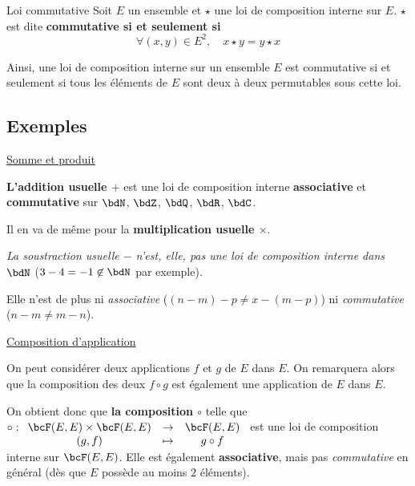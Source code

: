 \documentclass[a4paper,french,bookmarks]{article}
\begin{document}
\begin{definition}{Loi commutative}{}
    Soit $E$ un ensemble et $\star$ une loi de composition interne sur $E$. $\star$ est dite \bf{commutative} si et seulement si
    \[\forall (x, y) \in E^2,\quad x \star y = y \star x \]
\end{definition}

Ainsi, une loi de composition interne sur un ensemble $E$ est commutative si et seulement si tous les éléments de $E$ sont deux à deux permutables sous cette loi.

\subsection{Exemples}

\begin{enumerate}

    \ithand \underline{Somme et produit}
    
    \begin{enumerate}
    
        \itstar  \textbf{L'addition usuelle $+$} est une loi de composition interne \textbf{associative} et \textbf{commutative} sur $\bdN$, $\bdZ$, $\bdQ$, $\bdR$, $\bdC$.
        
        \itstar Il en va de même pour la \textbf{multiplication usuelle $\times$}.
    
        \itstar \textit{La soustraction usuelle $-$ n'est, elle, pas une loi de composition interne dans $\bdN$} ($3 - 4 = -1 \not\in \bdN$ par exemple).
        
        Elle n'est de plus ni \textit{associative} ($(n - m) -p \neq x - (m - p)$) ni \textit{commutative} ($n - m \neq m - n$).
    \end{enumerate}
    
    \ithand \underline{Composition d'application}
    
    On peut considérer deux applications $f$ et $g$ de $E$ dans $E$. On remarquera alors que la composition des deux $f \circ g$ est également une application de $E$ dans $E$.
    
    \begin{enumerate}
    
        \itstar On obtient donc que \textbf{la composition $\circ$} telle que $\circ : \begin{array}[t]{ccc}
        \bcF(E, E) \times \bcF(E, E) &\to& \bcF(E, E) \\
        (g, f) &\mapsto& g \circ f
    \end{array}$ est une loi de composition interne sur $\bcF(E, E)$.
    Elle est également \textbf{associative}, mais pas \textit{commutative} en général (dès que $E$ possède au moins $2$ éléments).
    

\end{enumerate}
\end{enumerate}
\end{document}
